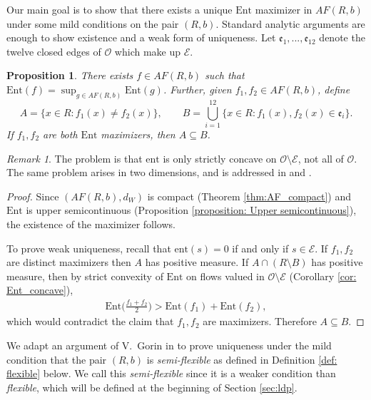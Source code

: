\documentclass[11pt]{article}
\newtheorem{prop}[thm]{Proposition}
\theoremstyle{remark}
\newtheorem{rem}[thm]{Remark}
\theoremstyle{definition}
\newcommand{\ent}{\text{ent}}
\newcommand{\Ent}{\text{Ent}}
\newcommand{\mc}[1]{\mathcal{#1}}
\begin{document}
Our main goal is to show that there exists a unique $\Ent$ maximizer in $AF(R,b)$ under some mild conditions on the pair $(R,b)$. Standard analytic arguments are enough to show existence and a weak form of uniqueness. Let $\mathfrak e_1,...,\mathfrak e_{12}$ denote the twelve closed edges of $\mathcal O$ which make up $\mc E$. 
\begin{prop}\label{prop: weak uniqueness}
    There exists $f \in AF(R,b)$ such that $\Ent(f) = \sup_{g\in AF(R,b)} \Ent(g)$. Further, given $f_1, f_2\in AF(R,b)$, define 
    $$A = \{x\in R : f_1(x) \neq f_2(x)\},\qquad B =  \bigcup_{i=1}^{12} \{x\in R : f_1 (x),f_2(x) \in \mathfrak e_i\}.$$
    If $f_1, f_2$ are both $\Ent$ maximizers, then $A \subseteq B$. 
\end{prop}
\begin{rem}
The problem is that $\ent$ is only strictly concave on $\mc O\setminus \mc E$, not all of $\mc O$. The same problem arises in two dimensions, and is addressed in \cite{gorin2021lectures} and \cite{Savin}. 
\end{rem}
\begin{proof} Since $(AF(R,b),d_W)$ is compact (Theorem \ref{thm:AF_compact}) and $\Ent$ is upper semicontinuous (Proposition \ref{proposition: Upper semicontinuous}), the existence of the maximizer follows. 

    
    To prove weak uniqueness, recall that $\ent(s) = 0$ if and only if $s\in \mc E$. If $f_1,f_2$ are distinct maximizers then $A$ has positive measure. If $A \cap (R\setminus B)$ has positive measure, then by strict convexity of $\Ent$ on flows valued in $\mc O\setminus \mc E$ (Corollary \ref{cor: Ent_concave}), 
    \begin{align*}
        \Ent\bigg( \frac{f_1 + f_2}{2}\bigg) > \Ent(f_1 ) + \Ent( f_2),
    \end{align*}
    which would contradict the claim that $f_1, f_2$ are maximizers. Therefore $A \subseteq B$.
\end{proof}

We adapt an argument of V.~Gorin in \cite[Proposition 7.10]{gorin2021lectures} to prove uniqueness under the mild condition that the pair $(R,b)$ is \textit{semi-flexible} as defined in Definition \ref{def: flexible} below. We call this \textit{semi-flexible} since it is a weaker condition than \textit{flexible}, which will be defined at the beginning of Section \ref{sec:ldp}. 
\end{document}
